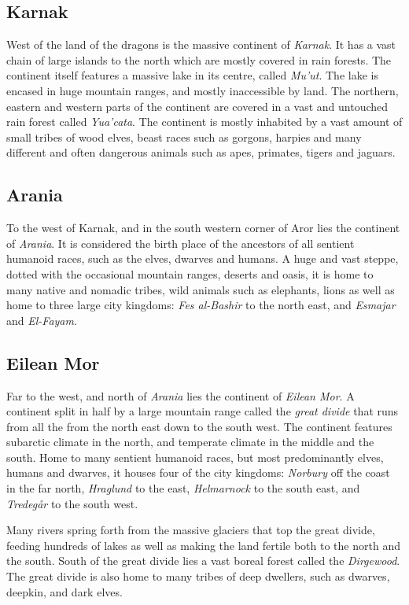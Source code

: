 \subsection*{Karnak}

West of the land of the dragons is the massive continent of \emph{Karnak}. It
has a vast chain of large islands to the north which are mostly covered in
rain forests. The continent itself features a massive lake in its centre,
called \emph{Mu'ut}. The lake is encased in huge mountain ranges, and mostly
inaccessible by land. The northern, eastern and western parts of the continent
are covered in a vast and untouched rain forest called \emph{Yua'cata}. The
continent is mostly inhabited by a vast amount of small tribes of wood elves,
beast races such as gorgons, harpies and many different and often dangerous
animals such as apes, primates, tigers and jaguars.

\subsection*{Arania}

To the west of Karnak, and in the south western corner of Aror lies the
continent of \emph{Arania}. It is considered the birth place of the ancestors
of all sentient humanoid races, such as the elves, dwarves and humans. A huge
and vast steppe, dotted with the occasional mountain ranges, deserts and oasis,
it is home to many native and nomadic tribes, wild animals such as elephants,
lions as well as home to three large city kingdoms: \emph{Fes al-Bashir} to
the north east, and \emph{Esmajar} and \emph{El-Fayam}.

\subsection*{Eilean Mor}

Far to the west, and north of \emph{Arania} lies the continent of \emph{Eilean
  Mor}. A continent split in half by a large mountain range called the
\emph{great divide} that runs from all the from the north east down to the
south west. The continent features subarctic climate in the north, and
temperate climate in the middle and the south. Home to many sentient humanoid
races, but most predominantly elves, humans and dwarves, it houses four of the
city kingdoms: \emph{Norbury} off the coast in the far north, \emph{Hraglund}
to the east, \emph{Helmarnock} to the south east, and \emph{Tredegår} to the
south west.

Many rivers spring forth from the massive glaciers that top the great divide,
feeding hundreds of lakes as well as making the land fertile both to the north
and the south. South of the great divide lies a vast boreal forest called the
\emph{Dirgewood}. The great divide is also home to many tribes of deep
dwellers, such as dwarves, deepkin, and dark elves.


